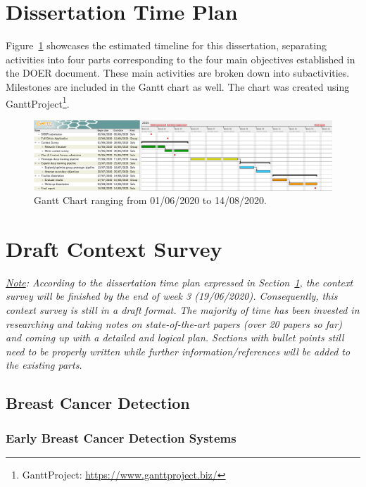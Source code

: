 \documentclass[letterpaper,12pt]{article}
\begin{document}
\section{Dissertation Time Plan}
\label{sec:time-plan}

Figure~\ref{fig:gantt_chart} showcases the estimated timeline for this dissertation, separating activities into four parts corresponding to the four main objectives established in the DOER document. These main activities are broken down into subactivities. Milestones are included in the Gantt chart as well. The chart was created using GanttProject\footnote{GanttProject: \url{https://www.ganttproject.biz/}}.

\begin{figure}[h]
\centerline{\includegraphics[width=\textwidth]{figures/gantt_chart.png}}
\caption{\label{fig:gantt_chart}Gantt Chart ranging from 01/06/2020 to 14/08/2020.}
\end{figure}



\section{Draft Context Survey}
\label{sec:draft-context-survey}

\textit{\underline{Note}: According to the dissertation time plan expressed in Section~\ref{sec:time-plan}, the context survey will be finished by the end of week 3 (19/06/2020). Consequently, this context survey is still in a draft format. The majority of time has been invested in researching and taking notes on state-of-the-art papers (over 20 papers so far) and coming up with a detailed and logical plan. Sections with bullet points still need to be properly written while further information/references will be added to the existing parts.}

\subsection{Breast Cancer Detection}

\subsubsection{Early Breast Cancer Detection Systems}
\end{document}
